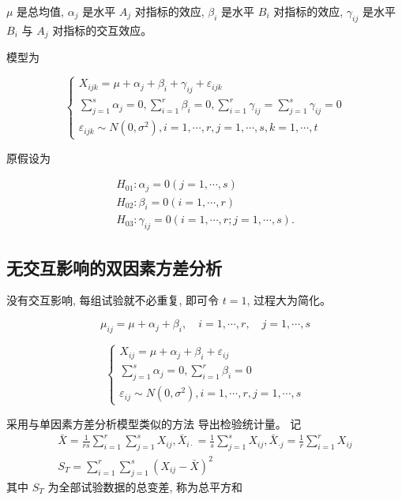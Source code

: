 \( \mu \) 是总均值, \( \alpha_{j} \) 是水平 \( A_{j} \) 对指标的效应, \( \beta_{i} \) 是水平 \( {B}_{i} \)
对指标的效应, \( \gamma_{i j} \) 是水平 \( B_{i} \) 与 \( A_{j} \) 对指标的交互效应。 

模型为

$$ \left\{\begin{array}{l}{X}_{i j k}=\mu+{\alpha}_{j}+\beta_{i}+\gamma_{i j}+\varepsilon_{i j k} \\ \sum_{j=1}^{s} \alpha_{j}=0, \sum_{i=1}^{r} \beta_{i}=0, \sum_{i=1}^{r} \gamma_{i j}=\sum_{j=1}^{s} \gamma_{i j}=0 \\ \varepsilon_{i j k} \sim N\left(0, \sigma^{2}\right), i=1, \cdots, r, j=1, \cdots, s, k=1, \cdots, t\end{array}\right. $$

原假设为

$$
\begin{array}{l}
H_{01}: \alpha_{j}=0(j=1, \cdots, s) \\
H_{02}: \beta_{i}=0(i=1, \cdots, r) \\
H_{03}: \gamma_{i j}=0(i=1, \cdots, r ; j=1, \cdots, s) .
\end{array}
$$

\subsection{无交互影响的双因素方差分析}

没有交互影响, 每组试验就不必重复, 即可令 \( {t}={1} \),
过程大为简化。 

$$
\mu_{i j}=\mu+\alpha_{j}+\beta_{i}, \quad i=1, \cdots, r, \quad j=1, \cdots, s
$$

$$ \left\{\begin{array}{l}X_{i j}=\mu+\alpha_{j}+\beta_{i}+\varepsilon_{i j} \\ \sum_{j=1}^{s} \alpha_{j}=0, \sum_{i=1}^{r} \beta_{i}=0 \\ \varepsilon_{i j} \sim N\left(0, \sigma^{2}\right), i=1, \cdots, r, j=1, \cdots, s\end{array}\right. $$

采用与单因素方差分析模型类似的方法 导出检验统计量。 
记
$$
\begin{array}{c}
\bar{X}=\frac{1}{r s} \sum_{i=1}^{r} \sum_{j=1}^{s} X_{i j}, \bar{X}_{i \cdot}=\frac{1}{s} \sum_{j=1}^{s} X_{i j}, \bar{X}_{\cdot j}=\frac{1}{r} \sum_{i=1}^{r} X_{i j} \\
S_{T}=\sum_{i=1}^{r} \sum_{j=1}^{s}\left(X_{i j}-\bar{X}\right)^{2}
\end{array}
$$
其中 \( S_{T} \) 为全部试验数据的总变差, 称为总平方和

